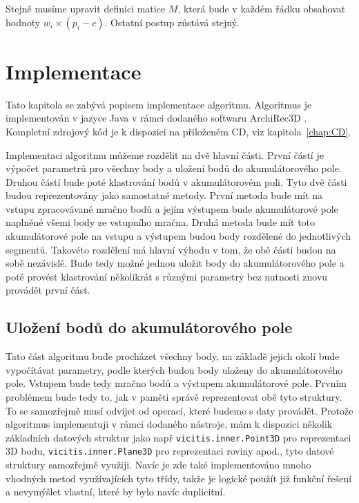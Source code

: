 \documentclass[11pt,twoside,a4paper]{book}
\begin{document}
Stejně musíme upravit definici matice $M$, která bude v každém řádku obsahovat hodnoty $w_i \times (p_i - c)$. Ostatní postup zůstává stejný.

\chapter{Implementace}
\label{chap:implementace}

Tato kapitola se zabývá popisem implementace algoritmu. Algoritmus je implementován v jazyce Java v rámci dodaného softwaru ArchiRec3D \cite{AR3D}. Kompletní zdrojový kód je k dispozici na přiloženém CD, viz kapitola~\ref{chap:CD}.


Implementaci algoritmu můžeme rozdělit na dvě hlavní části. První částí je výpočet parametrů pro všechny body a uložení bodů do akumulátorového pole. Druhou částí bude poté klastrování bodů v akumulátorovém poli. Tyto dvě části budou reprezentovány jako samostatné metody. První metoda bude mít na vstupu zpracovávané mračno bodů a jejím výstupem bude akumulátorové pole naplněné všemi body ze vstupního mračna. Druhá metoda bude mít toto akumulátorové pole na vstupu a výstupem budou body rozdělené do jednotlivých segmentů. Takovéto rozdělení má hlavní výhodu v tom, že obě části budou na sobě nezávislé. Bude tedy možné jednou uložit body do akumulátorového pole a poté provést klastrování několikrát s různými parametry bez nutnosti znovu provádět první část.

\section{Uložení bodů do akumulátorového pole}

Tato část algoritmu bude procházet všechny body, na základě jejich okolí bude vypočítávat parametry, podle kterých budou body uloženy do akumulátorového pole. Vstupem bude tedy mračno bodů a výstupem akumulátorové pole. Prvním problémem bude tedy to, jak v paměti správě reprezentovat obě tyto struktury. To se samozřejmě musí odvíjet od operací, které budeme s daty provádět. Protože algoritmus implementuji v rámci dodaného nástroje, mám k dispozici několik základních datových struktur jako např \verb|vicitis.inner.Point3D| pro reprezentaci 3D bodu, \verb|vicitis.inner.Plane3D| pro reprezentaci roviny apod., tyto datové struktury samozřejmě využiji. Navíc je zde také implementováno mnoho vhodných metod využívajících tyto třídy, takže je logické použít již funkční řešení a nevymýšlet vlastní, které by bylo navíc duplicitní.
\end{document}
